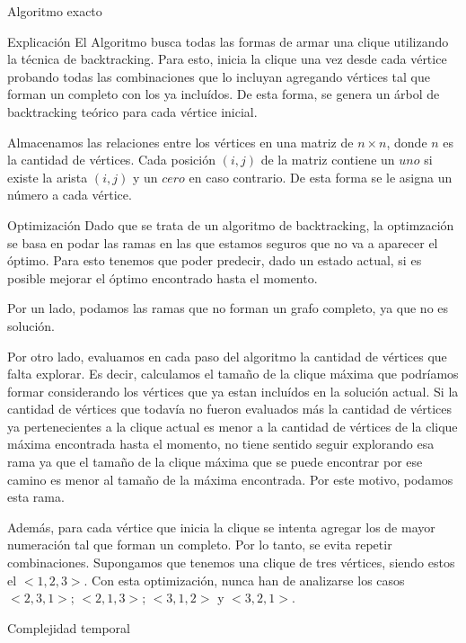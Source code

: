 \begin{section}{Algoritmo exacto}
		\begin{subsection}{Explicación}
			El Algoritmo busca todas las formas de armar una clique utilizando la técnica de backtracking. Para esto, inicia la clique una vez desde cada vértice probando todas las combinaciones que lo incluyan agregando vértices tal que forman un completo con los ya incluídos. De esta forma, se genera un árbol de backtracking teórico para cada vértice inicial.

			Almacenamos las relaciones entre los vértices en una matriz de $n \times n$, donde $n$ es la cantidad de vértices. Cada posición $(i,j)$ de la matriz contiene un $uno$ si existe la arista $(i,j)$ y un $cero$ en caso contrario. De esta forma se le asigna un número a cada vértice.\VSP
		\end{subsection}
		\begin{subsection}{Optimización}
			Dado que se trata de un algoritmo de backtracking, la optimzación se basa en podar las ramas en las que estamos seguros que no va a aparecer el óptimo. Para esto tenemos que poder predecir, dado un estado actual, si es posible mejorar el óptimo encontrado hasta el momento.
			
			Por un lado, podamos las ramas que no forman un grafo completo, ya que no es solución.
			
			Por otro lado, evaluamos en cada paso del algoritmo la cantidad de vértices que falta explorar. Es decir, calculamos el tamaño de la clique máxima que podríamos formar considerando los vértices que ya estan incluídos en la solución actual. Si la cantidad de vértices que todavía no fueron evaluados más la cantidad de vértices ya pertenecientes a la clique actual es menor a la cantidad de vértices de la clique máxima encontrada hasta el momento, no tiene sentido seguir explorando esa rama ya que el tamaño de la clique máxima que se puede encontrar por ese camino es menor al tamaño de la máxima encontrada. Por este motivo, podamos esta rama.

			Además, para cada vértice que inicia la clique se intenta agregar los de mayor numeración tal que forman un completo. Por lo tanto, se evita repetir combinaciones. Supongamos que tenemos una clique de tres vértices, siendo estos el $<1,2,3>$. Con esta optimización, nunca han de analizarse los casos $<2,3,1>$; $<2,1,3>$; $<3,1,2>$ y $<3,2,1>$.
		\end{subsection}
		\begin{subsection}{Complejidad temporal}


\end{subsection}
\end{section}
